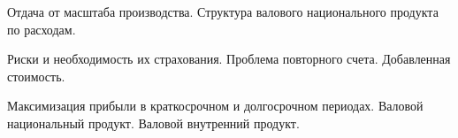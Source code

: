 \documentclass[
	14pt,
	a4paper,
	]
	{scrartcl}
\begin{document}
\vfill
\z 	Отдача от масштаба производства.
 \vfill
\z 	Структура валового национального продукта по расходам.
 \vfill

\vfill

\newpage


\shapk
{}
\setcounter{zad}{0}

\vfill
\z 	Риски и необходимость их страхования.
 \vfill
\z 	Проблема повторного счета. Добавленная стоимость.
 \vfill

\vfill

\newpage


\shapk
{}
\setcounter{zad}{0}

\vfill
\z 	Максимизация прибыли в краткосрочном и долгосрочном периодах.
 \vfill
\z 	Валовой национальный продукт.  Валовой внутренний продукт.
 \vfill

\vfill

\newpage
\end{document}
